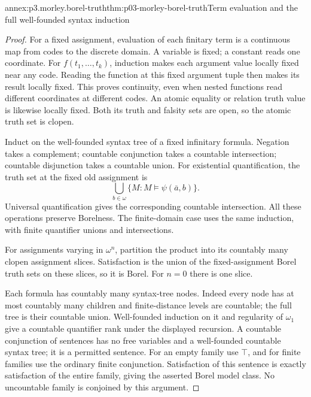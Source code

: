 \begin{annexitem}{annex:p3.morley.borel-truth}{thm:p03-morley-borel-truth}{Term evaluation and the full well-founded syntax induction}
\begin{proof}
For a fixed assignment, evaluation of each finitary
term is a continuous map from codes to the discrete
domain. A variable is fixed; a constant reads one
coordinate. For \(f(t_1,\ldots,t_k)\), induction
makes each argument value locally fixed near any code.
Reading the function at this fixed argument tuple
then makes its result locally fixed.
This proves continuity, even when nested functions
read different coordinates at different codes.
An atomic equality or relation truth value is likewise
locally fixed. Both its truth and falsity sets are open,
so the atomic truth set is clopen.

Induct on the well-founded syntax tree of a fixed
infinitary formula. Negation takes a complement;
countable conjunction takes a countable intersection;
countable disjunction takes a countable union.
For existential quantification, the truth set at
the fixed old assignment is
\[
 \bigcup_{b\in\omega}
       \{M:M\models\psi(\bar a,b)\}.
\]
Universal quantification gives the corresponding
countable intersection.
All these operations preserve Borelness.
The finite-domain case uses the same induction,
with finite quantifier unions and intersections.

For assignments varying in \(\omega^n\), partition
the product into its countably many clopen assignment
slices. Satisfaction is the union of the fixed-assignment
Borel truth sets on these slices, so it is Borel.
For \(n=0\) there is one slice.

Each formula has countably many syntax-tree nodes.
Indeed every node has at most countably many children
and finite-distance levels are countable; the full
tree is their countable union.
Well-founded induction on it and regularity of
\(\omega_1\) give a countable quantifier rank under
the displayed recursion.
A countable conjunction of sentences has no free
variables and a well-founded countable syntax tree;
it is a permitted sentence. For an empty family use
\(\top\), and for finite families use the ordinary
finite conjunction. Satisfaction of this sentence is
exactly satisfaction of the entire family, giving
the asserted Borel model class.
No uncountable family is conjoined by this argument.
\end{proof}
\end{annexitem}


